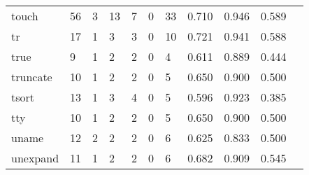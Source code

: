\begin{longtable}{lp{1.10cm}p{1.10cm}p{1.10cm}p{1.10cm}p{1.10cm}p{1.10cm}p{1.10cm}p{1.10cm}p{1.10cm}p{1.10cm}}
touch     &                     56 &                                  3 &                                13 &                                7 &                                 0 &                              33 &                          0.710 &                                 0.946 &                               0.589 \\
tr        &                     17 &                                  1 &                                 3 &                                3 &                                 0 &                              10 &                          0.721 &                                 0.941 &                               0.588 \\
true      &                      9 &                                  1 &                                 2 &                                2 &                                 0 &                               4 &                          0.611 &                                 0.889 &                               0.444 \\
truncate  &                     10 &                                  1 &                                 2 &                                2 &                                 0 &                               5 &                          0.650 &                                 0.900 &                               0.500 \\
tsort     &                     13 &                                  1 &                                 3 &                                4 &                                 0 &                               5 &                          0.596 &                                 0.923 &                               0.385 \\
tty       &                     10 &                                  1 &                                 2 &                                2 &                                 0 &                               5 &                          0.650 &                                 0.900 &                               0.500 \\
uname     &                     12 &                                  2 &                                 2 &                                2 &                                 0 &                               6 &                          0.625 &                                 0.833 &                               0.500 \\
unexpand  &                     11 &                                  1 &                                 2 &                                2 &                                 0 &                               6 &                          0.682 &                                 0.909 &                               0.545 \\

\end{longtable}
